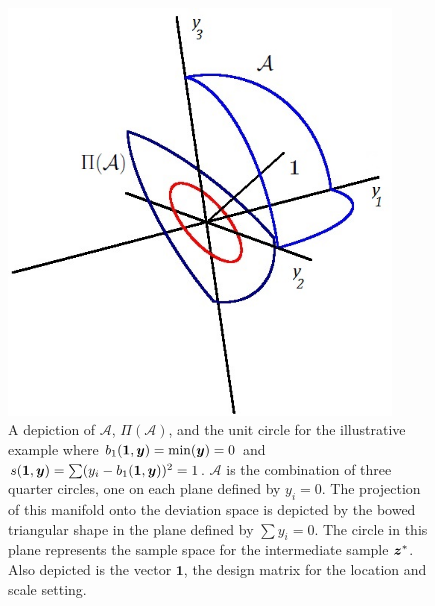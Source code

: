 \documentclass[12pt]{article}
\newcommand{\by}{\mbox{\boldmath $y$}}
\newcommand{\bz}{\mbox{\boldmath $z$}}
\begin{document}
\begin{figure}[t]
\centering
\includegraphics[width=4in]{minSS3dSampleSpace.jpg}
\caption{A depiction of $\mathcal{A}$, $\Pi(\mathcal{A})$, and the
  unit circle for the illustrative example where $b_{1}(\mathbf{1},\by)=\min(\by)=0$ and
  $s(\mathbf{1},\by)=\sum (y_i -b_{1}(\mathbf{1},\by))^2 =1$.
$\mathcal{A}$ is the combination of three quarter circles, one
  on each plane defined by $y_i=0$. The projection of this manifold
  onto the deviation space is depicted by the bowed triangular shape
  in the plane defined by $\sum y_i=0$. The circle in this plane
  represents the sample space for the intermediate sample $\bz^*$. Also
  depicted is the vector $\mathbf{1}$, the design matrix for the
  location and scale setting.}
\label{fig:sampSpace}
\end{figure}
\end{document}
